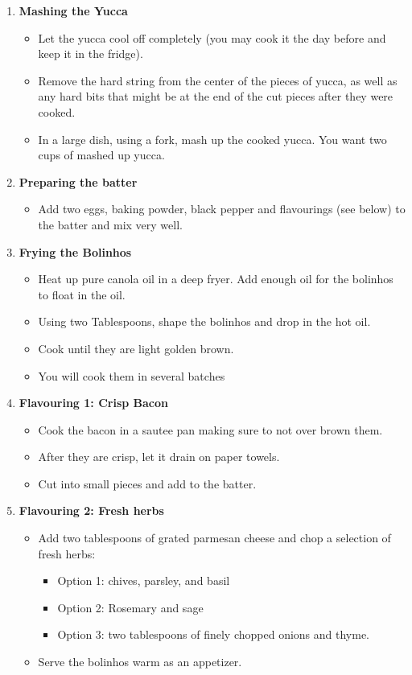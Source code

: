 \documentclass[11pt,letterpaper]{article}
\begin{document}
\begin{description}
\begin{enumerate}
\begin{itemize}
	\end{itemize}
	\item {\bf Mashing the Yucca}
	\begin{itemize}
	\item Let the yucca cool off completely (you may cook it the day before and keep it in the fridge).
	\item Remove the hard string from the center of the pieces of yucca, as well as any hard bits that might be at the end of the cut pieces after they were cooked.
	\item In a large dish, using a fork, mash up the cooked yucca. You want two cups of mashed up yucca.
	\end{itemize}
	\item {\bf Preparing the batter}
	\begin{itemize}
	\item Add two eggs, baking powder, black pepper and flavourings (see below) to the batter and mix very well.
	\end{itemize}
	\item {\bf Frying the Bolinhos}
        \begin{itemize}
	\item Heat up pure canola oil in a deep fryer. Add enough oil for the bolinhos to float in the oil.
	\item Using two Tablespoons, shape the bolinhos and drop in the hot oil.
	\item Cook until they are light golden brown.
	\item You will cook them in several batches
	\end{itemize}
	\item {\bf Flavouring 1: Crisp Bacon}
	\begin{itemize}
	\item Cook the bacon in a sautee pan making sure to not over brown them.
	\item After they are crisp, let it drain on paper towels.
	\item Cut into small pieces and add to the batter.
	\end{itemize}
	\item {\bf Flavouring 2: Fresh herbs}
	\begin{itemize}
	\item Add two tablespoons of grated parmesan cheese and chop a selection of fresh herbs:
		\begin{itemize}
		\item Option 1: chives, parsley, and basil
		\item Option 2: Rosemary and sage
		\item Option 3: two tablespoons of finely chopped onions and thyme.
		\end{itemize}
	\item Serve the bolinhos warm as an appetizer.
	\end{itemize}
	\end{enumerate}
\end{description}
\end{document}
